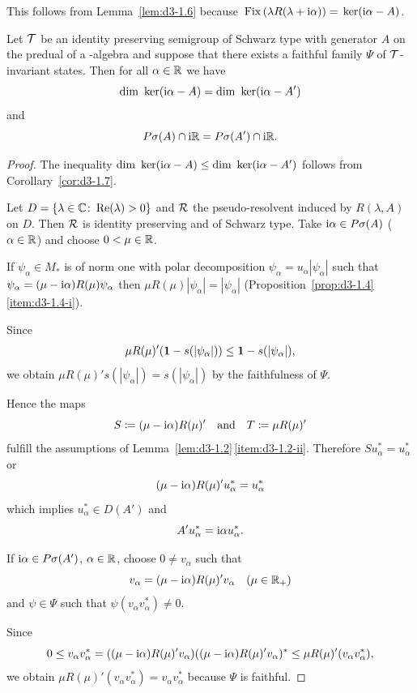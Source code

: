 This follows from Lemma~\ref{lem:d3-1.6} because $\mathop{}\mathrm{Fix}\left(\lambda R(\lambda+\mathrm{i}\alpha)\right) = \mathop{}\mathrm{ker}(\mathrm{i}\alpha-A)$.
\begin{proposition}\label{prop:d3-1.8}
Let $\mathcal{T}$ be an identity preserving semigroup of Schwarz type with generator $A$ on the predual of a \WA-algebra and suppose that there exists a faithful family $\Psi$ of\/ $\mathcal{T}$-invariant states.
Then for all $\alpha \in \mathbb{R}$ we have
\[
\mathop{}\!\mathrm{dim}\, \mathop{}\mathrm{ker}(\mathrm{i}\alpha - A) = \mathop{}\!\mathrm{dim}\, \mathop{}\mathrm{ker}(\mathrm{i}\alpha - A')
\]
and
\[
P\sigma(A) \cap \mathrm{i}\mathbb{R} = P{\sigma}(A') \cap \mathrm{i}\mathbb{R} .
\]
\end{proposition}
\begin{proof}
The inequality $\dim \Kern{\im\alpha - A} \leq \dim \Kern{\im\alpha - A'}$ follows from Corollary~\ref{cor:d3-1.7}.

Let $D = \{\lambda \in \mathbb{C} \colon \mathop{}\!\mathrm{Re}(\lambda) > 0\}$ and $\mathcal{R}$ the pseudo-resolvent induced by $R(\lambda,A)$ on $D$.
Then $\mathcal{R}$ is identity preserving and of Schwarz type.
Take $\mathrm{i}\alpha \in P\sigma(A)$ ($\alpha \in \mathbb{R}$) and choose $0 < \mu \in \mathbb{R}$.

If\/ $\psi_{\alpha} \in M_{*}$ is of norm one with polar decomposition $\psi_{\alpha} = u_{\alpha}|\psi_{\alpha}|$ such that $\psi_{\alpha} = (\mu - \mathrm{i}\alpha)R(\mu)\psi_{\alpha}$ then $\mu R(\mu)|\psi_{\alpha}| = |\psi_{\alpha}|$ (Proposition~\ref{prop:d3-1.4}\,\ref{item:d3-1.4-i}).

Since
\[
\mu R(\mu)'(\1 - s(|\psi_{\alpha}|)) 
    \leq \1 - s(|\psi_{\alpha}|) ,
\]
we obtain $\mu R(\mu)'s(|\psi_{\alpha}|) = s(|\psi_{\alpha}|)$ by the faithfulness of\/ $\Psi$.

Hence the maps 
\[
S \coloneq (\mu - \mathrm{i}\alpha)R(\mu)'  
\quad \text{and} \quad 
T \coloneq \mu R(\mu)'
\]
fulfill the assumptions of Lemma~\ref{lem:d3-1.2}\,\ref{item:d3-1.2-ii}.
Therefore $Su_{\alpha}^{*} = u_{\alpha}^{*}$ or 
\[
(\mu-\mathrm{i}\alpha)R(\mu)'u_{\alpha}^{*} = u_{\alpha}^{*}
\]
which implies $u_{\alpha}^{*} \in D(A')$ and 
\[
A'u_{\alpha}^{*} = \mathrm{i}\alpha u_{\alpha}^{*}.
\]

If\/ $\mathrm{i}\alpha \in P{\sigma}(A')$, $\alpha \in \mathbb{R}$, choose $0 \neq v_{\alpha}$ such that
\[
v_{\alpha} = (\mu - \mathrm{i}\alpha)R(\mu)'v_{\alpha} \quad (\mu \in \mathbb{R}_{+})
\]
and $\psi \in \Psi$ such that $\psi(v_{\alpha}v_{\alpha}^{*}) \neq 0$.

Since
\[
0 \leq v_{\alpha}v_{\alpha}^{*} = ((\mu - \im\alpha)R(\mu)'v_{\alpha})((\mu - \im\alpha)R(\mu)'v_{\alpha})^{*} \leq \mu R(\mu)'(v_{\alpha}v_{\alpha}^{*}) ,
\]
we obtain $\mu R(\mu)'(v_{\alpha}v_{\alpha}^{*}) = v_{\alpha}v_{\alpha}^{*}$ because $\Psi$ is faithful.


\end{proof}
